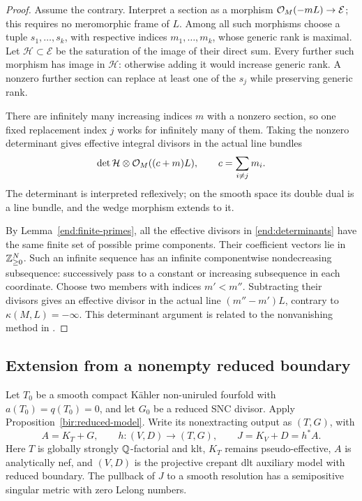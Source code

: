 \begin{proof}
Assume the contrary. Interpret a section as a morphism
\(\mathcal{O}_M(-mL)\to\mathcal E\); this requires no meromorphic frame
of \(L\). Among all such morphisms choose a tuple
\(s_1,\ldots,s_k\), with respective indices \(m_1,\ldots,m_k\),
whose generic rank is maximal. Let \(\mathcal H\subset\mathcal E\)
be the saturation of the image of their direct sum. Every further
such morphism has image in \(\mathcal H\): otherwise adding it
would increase generic rank. A nonzero further section can replace
at least one of the \(s_j\) while preserving generic rank.

There are infinitely many increasing indices \(m\) with a nonzero
section, so one fixed replacement index \(j\) works for infinitely
many of them. Taking the nonzero determinant gives effective integral
divisors in the actual line bundles
\begin{equation}\label{end:determinants}
 \det\mathcal H\otimes\mathcal{O}_M((c+m)L),
 \qquad c=\sum_{i\ne j}m_i.
\end{equation}
The determinant is interpreted reflexively; on the smooth space its
double dual is a line bundle, and the wedge morphism extends to it.

By Lemma~\ref{end:finite-primes}, all the effective divisors in
\eqref{end:determinants} have the same finite set of possible prime
components. Their coefficient vectors lie in \(\mathbb{Z}_{\ge0}^{N}\).
Such an infinite sequence has an infinite componentwise
nondecreasing subsequence: successively pass to a constant or
increasing subsequence in each coordinate. Choose two members with
indices \(m'<m''\). Subtracting their divisors gives an effective
divisor in the actual line \((m''-m')L\), contrary to
\(\kappa(M,L)=-\infty\). This determinant argument is related to
the nonvanishing method in \cite{HLLNonvanishing}.
\end{proof}

\subsection{Extension from a nonempty reduced boundary}

Let \(T_0\) be a smooth compact K\"ahler non-uniruled fourfold
with \(a(T_0)=q(T_0)=0\), and let \(G_0\) be a reduced SNC
divisor. Apply Proposition~\ref{bir:reduced-model}. Write its
nonextracting output as \((T,G)\), with
\[
 A=K_T+G,
 \qquad h:(V,D)\longrightarrow(T,G),
 \qquad J=K_V+D=h^*A.
\]
Here \(T\) is globally strongly \(\mathbb{Q}\)-factorial and klt,
\(K_T\) remains pseudo-effective, \(A\) is analytically nef,
and \((V,D)\) is the projective crepant dlt auxiliary model with
reduced boundary. The pullback of \(J\) to a smooth resolution
has a semipositive singular metric with zero Lelong numbers.

